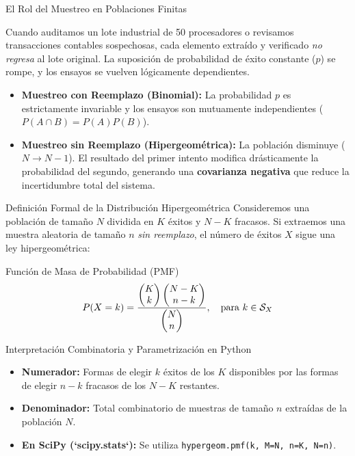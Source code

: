 \documentclass[10pt, aspectratio=169]{beamer}
\begin{document}
\begin{frame}{El Rol del Muestreo en Poblaciones Finitas}
  \footnotesize
  \begin{motivacion}
    Cuando auditamos un lote industrial de 50 procesadores o revisamos transacciones contables sospechosas, cada elemento extraído y verificado \emph{no regresa} al lote original. La suposición de probabilidad de éxito constante ($p$) se rompe, y los ensayos se vuelven lógicamente dependientes.
  \end{motivacion}
  
  \vspace{0.15cm}
  \pause
  \begin{itemize}\itemsep=0.1cm
    \item \textbf{Muestreo con Reemplazo (Binomial):} La probabilidad $p$ es estrictamente invariable y los ensayos son mutuamente independientes ($P(A \cap B) = P(A)P(B)$). \pause
    \item \textbf{Muestreo sin Reemplazo (Hipergeométrica):} La población disminuye ($N \to N-1$). El resultado del primer intento modifica drásticamente la probabilidad del segundo, generando una \textbf{covarianza negativa} que reduce la incertidumbre total del sistema.
  \end{itemize}
\end{frame}

\begin{frame}{Definición Formal de la Distribución Hipergeométrica}
  \footnotesize
  Consideremos una población de tamaño $N$ dividida en $K$ éxitos y $N-K$ fracasos. Si extraemos una muestra aleatoria de tamaño $n$ \emph{sin reemplazo}, el número de éxitos $X$ sigue una ley hipergeométrica: \pause

  \vspace{0.1cm}
  \begin{block}{Función de Masa de Probabilidad (PMF)}
    $$P(X = k) = \dfrac{\begin{pmatrix} K \\ k \end{pmatrix} \begin{pmatrix} N-K \\ n-k \end{pmatrix}}{\begin{pmatrix} N \\ n \end{pmatrix}}, \quad \text{para } k \in \mathcal{S}_X$$
  \end{block}

  \vspace{0.1cm}
  \pause
  \begin{alertblock}{Interpretación Combinatoria y Parametrización en Python}
    \begin{itemize}\itemsep=0.06cm
      \item \textbf{Numerador:} Formas de elegir $k$ éxitos de los $K$ disponibles por las formas de elegir $n-k$ fracasos de los $N-K$ restantes.
      \item \textbf{Denominador:} Total combinatorio de muestras de tamaño $n$ extraídas de la población $N$.
      \item \textbf{En SciPy (`scipy.stats`):} Se utiliza \texttt{hypergeom.pmf(k, M=N, n=K, N=n)}.
    \end{itemize}
  \end{alertblock}
\end{frame}
\end{document}
